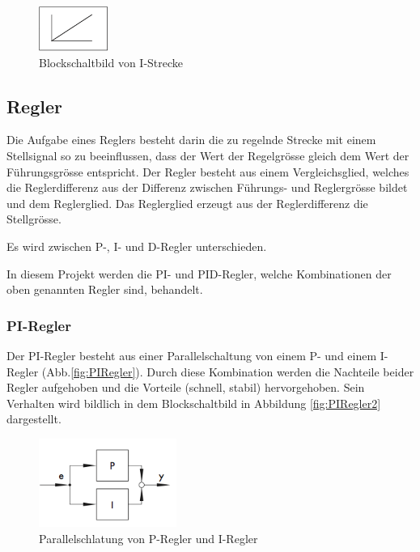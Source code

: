 \begin{figure}[h!, width=\pagewidth]
    \centering
    \includegraphics[width=0.2\textwidth]{images/IStrecke}
    \caption{Blockschaltbild von I-Strecke}
    \label{fig:IStrecke}
\end{figure}


\subsection{Regler}

Die Aufgabe  eines Reglers  besteht darin  die zu  regelnde Strecke  mit einem
Stellsignal  so  zu  beeinflussen,  dass der  Wert  der  Regelgr\"osse  gleich
dem  Wert  der F\"uhrungsgr\"osse  entspricht. Der  Regler  besteht aus  einem
Vergleichsglied,  welches  die  Reglerdifferenz  aus  der  Differenz  zwischen
F\"uhrungs-  und Reglergr\"osse  bildet und  dem Reglerglied. Das  Reglerglied
erzeugt aus der Reglerdifferenz die Stellgr\"osse.

Es wird zwischen P-, I- und D-Regler unterschieden.

In diesem Projekt werden die PI- und PID-Regler, welche Kombinationen der oben
genannten Regler sind, behandelt.


\subsubsection{PI-Regler}
Der  PI-Regler   besteht  aus  einer   Parallelschaltung  von  einem   P-  und
einem  I-Regler (Abb.\ref{fig:PIRegler}). Durch  diese Kombination  werden die
Nachteile  beider  Regler  aufgehoben   und  die  Vorteile  (schnell,  stabil)
hervorgehoben. Sein  Verhalten   wird  bildlich  in  dem   Blockschaltbild  in
Abbildung \ref{fig:PIRegler2} dargestellt.

\begin{figure}[h!, width=\pagewidth]
    \centering
    \includegraphics[width=0.4\textwidth]{images/PIRegler1}
    \caption{Parallelschlatung von P-Regler und I-Regler}
    \label{fig:PIRegler1}
\end{figure}

